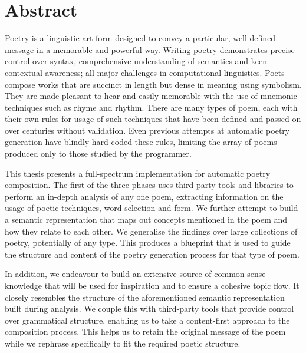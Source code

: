 \chapter{Abstract}
\ifpdf
    \graphicspath{{Abstract/AbstractFigs/PNG/}{Abstract/AbstractFigs/PDF/}{Abstract/AbstractFigs/}}
\else
    \graphicspath{{Abstract/AbstractFigs/EPS/}{Abstract/AbstractFigs/}}
\fi

Poetry is a linguistic art form designed to convey a particular, well-defined message in a memorable and powerful way. Writing poetry demonstrates precise control over syntax, comprehensive understanding of semantics and keen contextual awareness; all major challenges in computational linguistics. Poets compose works that are succinct in length but dense in meaning using symbolism. They are made pleasant to hear and easily memorable with the use of mnemonic techniques such as rhyme and rhythm. There are many types of poem, each with their own rules for usage of such techniques that have been defined and passed on over centuries without validation. Even previous attempts at automatic poetry generation have blindly hard-coded these rules, limiting the array of poems produced only to those studied by the programmer.

This thesis presents a full-spectrum implementation for automatic poetry composition. The first of the three phases uses third-party tools and libraries to perform an in-depth analysis of any one poem, extracting information on the usage of poetic techniques, word selection and form. We further attempt to build a semantic representation that maps out concepts mentioned in the poem and how they relate to each other. We generalise the findings over large collections of poetry, potentially of any type. This produces a blueprint that is used to guide the structure and content of the poetry generation process for that type of poem.

In addition, we endeavour to build an extensive source of common-sense knowledge that will be used for inspiration and to ensure a cohesive topic flow. It closely resembles the structure of the aforementioned semantic representation built during analysis. We couple this with third-party tools that provide control over grammatical structure, enabling us to take a content-first approach to the composition process. This helps us to retain the original message of the poem while we rephrase specifically to fit the required poetic structure.

